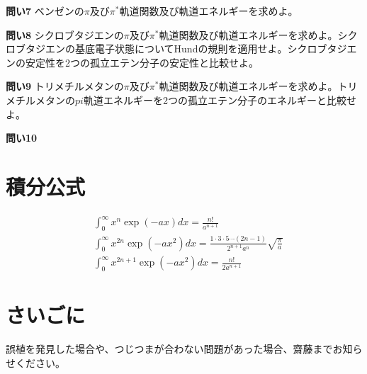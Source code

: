 \documentclass[11pt,pra,aps]{revtex4}
\begin{document}
\noindent
{\bf 問い7} ベンゼンの$\pi$及び$\pi^*$軌道関数及び軌道エネルギーを求めよ。

\noindent
{\bf 問い8} シクロブタジエンの$\pi$及び$\pi^*$軌道関数及び軌道エネルギーを求めよ。シクロブタジエンの基底電子状態についてHundの規則を適用せよ。シクロブタジエンの安定性を2つの孤立エテン分子の安定性と比較せよ。

\noindent
{\bf 問い9} トリメチルメタンの$\pi$及び$\pi^*$軌道関数及び軌道エネルギーを求めよ。トリメチルメタンの$pi$軌道エネルギーを2つの孤立エテン分子のエネルギーと比較せよ。

\noindent
{\bf 問い10} 

\section{積分公式}
\begin{align}
  &\int_0^\infty x^n \exp(-ax) dx = \frac{n!}{a^{n+1}} \\
  &\int_0^\infty x^{2n} \exp(-ax^2) dx = \frac{1\cdot3\cdot5\cdots(2n-1)}{2^{n+1}a^n}\sqrt{\frac{\pi}{a}} \\
  &\int_0^\infty x^{2n+1} \exp(-ax^2) dx = \frac{n!}{2 a^{n+1}}
\end{align}

\section{さいごに}

誤植を発見した場合や、つじつまが合わない問題があった場合、齋藤までお知らせください。
\end{document}
